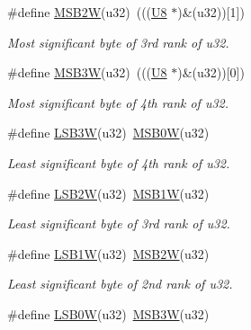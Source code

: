 \begin{DoxyCompactItemize}
\#define \mbox{\hyperlink{group__group__sam0__utils_ga0207e10a3c4bcca172463cd5e3ebd865}{M\+S\+B2W}}(u32)~(((\mbox{\hyperlink{group__group__sam0__utils_gaa63ef7b996d5487ce35a5a66601f3e73}{U8}}  $\ast$)\&(u32))\mbox{[}1\mbox{]})
\begin{DoxyCompactList}\small\item\em Most significant byte of 3rd rank of {\itshape u32}. \end{DoxyCompactList}\item 
\#define \mbox{\hyperlink{group__group__sam0__utils_gad6ab5ac6e3e95525d56d757c9718e352}{M\+S\+B3W}}(u32)~(((\mbox{\hyperlink{group__group__sam0__utils_gaa63ef7b996d5487ce35a5a66601f3e73}{U8}}  $\ast$)\&(u32))\mbox{[}0\mbox{]})
\begin{DoxyCompactList}\small\item\em Most significant byte of 4th rank of {\itshape u32}. \end{DoxyCompactList}\item 
\#define \mbox{\hyperlink{group__group__sam0__utils_ga04e75e548b33b9cc22699b4249ff6c64}{L\+S\+B3W}}(u32)~\mbox{\hyperlink{group__group__sam0__utils_ga25110f05bdb5b5ea3fcb2854a1a07d7a}{M\+S\+B0W}}(u32)
\begin{DoxyCompactList}\small\item\em Least significant byte of 4th rank of {\itshape u32}. \end{DoxyCompactList}\item 
\#define \mbox{\hyperlink{group__group__sam0__utils_gad8fda97f8caa00fcfa84f712ee7627d6}{L\+S\+B2W}}(u32)~\mbox{\hyperlink{group__group__sam0__utils_ga0f90ecd0b0f0e15608a95b8367b77ece}{M\+S\+B1W}}(u32)
\begin{DoxyCompactList}\small\item\em Least significant byte of 3rd rank of {\itshape u32}. \end{DoxyCompactList}\item 
\#define \mbox{\hyperlink{group__group__sam0__utils_ga84cbbcad1971cdb2987418e6ae6cb4ff}{L\+S\+B1W}}(u32)~\mbox{\hyperlink{group__group__sam0__utils_ga0207e10a3c4bcca172463cd5e3ebd865}{M\+S\+B2W}}(u32)
\begin{DoxyCompactList}\small\item\em Least significant byte of 2nd rank of {\itshape u32}. \end{DoxyCompactList}\item 
\#define \mbox{\hyperlink{group__group__sam0__utils_ga2ca8582260a8ada6cdd457cf37ba37a7}{L\+S\+B0W}}(u32)~\mbox{\hyperlink{group__group__sam0__utils_gad6ab5ac6e3e95525d56d757c9718e352}{M\+S\+B3W}}(u32)

\end{DoxyCompactItemize}
